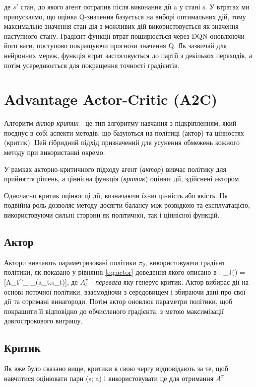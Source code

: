   \noindent де $s'$ стан, до якого агент потрапив після виконання дії a у стані s. У втратах ми припускаємо,
   що оцінка Q-значення базується на виборі оптимальних дій, тому максимальне значення стан-дія 
    з можливих дій використовується як значення наступного стану. Градієнт функції втрат поширюється
     через DQN оновлюючи його ваги, поступово покращуючи прогнози значення Q. Як зазвичай для
      нейронних мереж, функція втрат застосовується до партії з декількох переходів, а потім 
      усереднюється для покращення точності градієнтів.

\section{Advantage Actor-Critic (A2C)}
Алгоритм {\em актор-критик} - це тип алгоритму навчання з підкріпленням, який поєднує в собі аспекти методів, 
що базуються на політиці (актор) та ціннос\-тях (критик). Цей гібридний підхід призначений для усунення 
обмежень кожного методу при використанні окремо.

У рамках акторно-критичного підходу агент ({\em актор}) вивчає політику для прийняття рішень, а 
ціннісна функція ({\em критик}) оцінює дії, здійснені актором.

Одночасно критик оцінює ці дії, визначаючи їхню цінність або якість. Ця подвійна роль 
дозволяє методу досягти балансу між розвідкою та експ\-луа\-тацією, використовуючи сильні сторони як 
політичної, так і ціннісної функцій.

\subsection{Актор}
  Актори вивчають параметризовані політики $\pi_{\theta}$, використовуючи градієнт політики, як показано у рівнянні \ref{eq:actor} доведення якого описано в \cite{Ch3}.
   \nabla_{\theta}J(\theta) = [A_{t}^{\pi}\nabla_{\theta} \log \pi_{\theta}(a_t,s_t)], \eq
де $A_{t}^{\pi}$ - {\em перевага} яку генерує критик.
Актор вибирає дії на основі поточної політики, взаємодіючи з середовищем і збираючи дані про свої дії та
отримані винагороди. Потім актор оновлює параметри політики, щоб покращити її відповідно до обчисленого 
градієнта, з метою максимізації довгострокового виграшу.
\subsection{Критик}
Як вже було сказано вище, критики в свою чергу відповідають за те, щоб навчитися оцінювати пари 
(s; a) і використовувати це для отримання $A^{\pi}$


